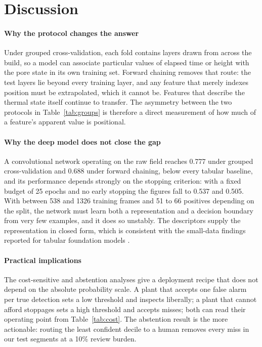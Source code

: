 \documentclass[preprint,12pt]{elsarticle}
\begin{document}
\section{Discussion}
\label{sec:disc}

\paragraph{Why the protocol changes the answer} Under grouped cross-validation, each fold contains layers drawn from across the build, so a model can associate particular values of elapsed time or height with the pore state in its own training set. Forward chaining removes that route: the test layers lie beyond every training layer, and any feature that merely indexes position must be extrapolated, which it cannot be. Features that describe the thermal state itself continue to transfer. The asymmetry between the two protocols in Table~\ref{tab:groups} is therefore a direct measurement of how much of a feature's apparent value is positional.

\paragraph{Why the deep model does not close the gap} A convolutional network operating on the raw field reaches 0.777 under grouped cross-validation and 0.688 under forward chaining, below every tabular baseline, and its performance depends strongly on the stopping criterion: with a fixed budget of 25 epochs and no early stopping the figures fall to 0.537 and 0.505. With between 538 and 1326 training frames and 51 to 66 positives depending on the split, the network must learn both a representation and a decision boundary from very few examples, and it does so unstably. The descriptors supply the representation in closed form, which is consistent with the small-data findings reported for tabular foundation models \cite{hollmann2025}.

\paragraph{Practical implications} The cost-sensitive and abstention analyses give a deployment recipe that does not depend on the absolute probability scale. A plant that accepts one false alarm per true detection sets a low threshold and inspects liberally; a plant that cannot afford stoppages sets a high threshold and accepts misses; both can read their operating point from Table~\ref{tab:cost}. The abstention result is the more actionable: routing the least confident decile to a human removes every miss in our test segments at a 10\% review burden.
\end{document}
